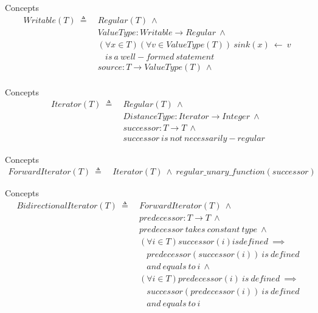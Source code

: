 \documentclass[10pt]{beamer}
\begin{document}
\begin{frame}{Concepts}
    \begin{align*}
        Writable(T) ~\triangleq~ & Regular(T) ~\land \\
        & ValueType: Writable \rightarrow Regular ~\land \\
        & (\forall x \in T) (\forall v \in ValueType(T))~sink(x)~\leftarrow~v ~ \\
        & ~~~~is~a~well-formed~statement \\
        & source: T \rightarrow ValueType(T) ~\land\\
    \end{align*}
\end{frame}


\begin{frame}{Concepts}
    \begin{align*}
        Iterator(T) ~\triangleq~ & Regular(T) ~\land \\
        & DistanceType: Iterator \rightarrow Integer ~\land \\
        & successor: T \rightarrow T ~\land\\
        & successor~is~not~necessarily-regular
    \end{align*}
\end{frame}

\begin{frame}{Concepts}
    \begin{align*}
        ForwardIterator(T) ~\triangleq~ & Iterator(T) ~\land ~regular\_unary\_function(successor)
    \end{align*}
\end{frame}

\begin{frame}{Concepts}
    \begin{align*}
        BidirectionalIterator(T) ~\triangleq~ & ForwardIterator(T) ~\land \\
                                              & predecessor: T \rightarrow T ~\land \\
                                              & predecessor~takes~constant~type ~\land \\
                                              & (\forall i \in T) successor(i) is defined~\implies \\
                                              & ~~~~predecessor(successor(i))~is~defined \\
                                              & ~~~~and~equals~to~i~ \land\\
                                              & (\forall i \in T) predecessor(i)~is~defined~ \implies \\
                                              & ~~~~successor(predecessor(i))~is~defined\\
                                              & ~~~~and~equals~to~i
    \end{align*}
\end{frame}
\end{document}
